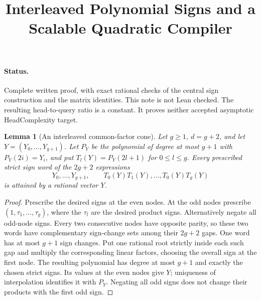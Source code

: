 \documentclass[11pt]{article}
\title{Interleaved Polynomial Signs and a Scalable Quadratic Compiler}
\author{}\date{}
\newtheorem{lemma}{Lemma}
\begin{document}
\maketitle
\paragraph{Status.}
Complete written proof, with exact rational checks of the central sign
construction and the matrix identities. This note is not Lean checked.
The resulting head-to-query ratio is a constant. It proves neither
accepted asymptotic HeadComplexity target.

\begin{lemma}[An interleaved common-factor cone]
Let $g\geq1$, $d=g+2$, and let $Y=(Y_0,\ldots,Y_{g+1})$.
Let $P_Y$ be the polynomial of degree at most $g+1$ with
$P_Y(2i)=Y_i$, and put $T_l(Y)=P_Y(2l+1)$ for $0\leq l\leq g$.
Every prescribed strict sign word of the $2g+2$ expressions
\[
 Y_0,\ldots,Y_{g+1},\qquad T_0(Y)T_1(Y),\ldots,T_0(Y)T_g(Y)
 \tag{1}
\]
is attained by a rational vector $Y$.
\end{lemma}
\begin{proof}
Prescribe the desired signs at the even nodes. At the odd nodes prescribe
$(1,\tau_1,\ldots,\tau_g)$, where the $\tau_l$ are the desired product
signs. Alternatively negate all odd-node signs. Every two consecutive
nodes have opposite parity, so these two words have complementary
sign-change sets among their $2g+2$ gaps. One word has at most $g+1$
sign changes. Put one rational root strictly inside each such gap and
multiply the corresponding linear factors, choosing the overall sign
at the first node. The resulting polynomial has degree at most $g+1$
and exactly the chosen strict signs. Its values at the even nodes give
$Y$; uniqueness of interpolation identifies it with $P_Y$. Negating all
odd signs does not change their products with the first odd sign.
\end{proof}
\end{document}
